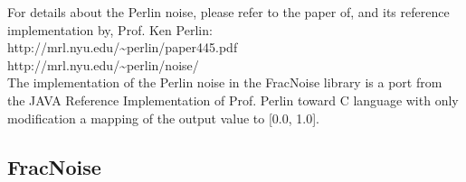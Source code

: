 For details about the Perlin noise, please refer to the paper of, and its reference implementation by, Prof. Ken Perlin:\\
http://mrl.nyu.edu/\textasciitilde perlin/paper445.pdf\\
http://mrl.nyu.edu/\textasciitilde perlin/noise/\\

The implementation of the Perlin noise in the FracNoise library is a port from the JAVA Reference Implementation of Prof. Perlin toward C language with only modification a mapping of the output value to [0.0, 1.0].\\

\subsection{FracNoise}

